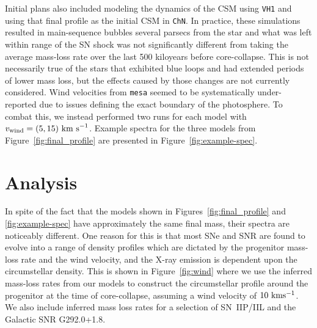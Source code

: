 \documentclass[twocolumn]{aastex631}
\begin{document}
Initial plans also included modeling the dynamics of the CSM using \texttt{VH1} and using that final profile as the initial CSM in \texttt{ChN}. In practice, these simulations resulted in main-sequence bubbles several parsecs from the star and what was left within range of the SN shock was not significantly different from taking the average mass-loss rate over the last 500 kiloyears before core-collapse. This is not necessarily true of the stars that exhibited blue loops and had extended periods of lower mass loss, but the effects caused by those changes are not currently considered. Wind velocities from \texttt{mesa} seemed to be systematically under-reported due to issues defining the exact boundary of the photosphere. To combat this, we instead performed two runs for each model with $v_{\rm wind} = (5,15)\  \text{km\ s}^{-1}$. Example spectra for the three models from Figure~\ref{fig:final_profile} are presented in Figure~\ref{fig:example-spec}.

\section{Analysis}
\label{spectra}
In spite of the fact that the models shown in Figures~\ref{fig:final_profile} and  \ref{fig:example-spec} have approximately the same final mass, their spectra are noticeably different. One reason for this is that %
most SNe and SNR are found to evolve into a range of density profiles which are dictated by the progenitor mass-loss rate and the wind velocity, and the X-ray emission is dependent upon the circumstellar density. This is shown in Figure~\ref{fig:wind} where we use the inferred mass-loss rates from our models to construct the circumstellar profile around the progenitor at the time of core-collapse, assuming a wind velocity of $10~\rm km s^{-1}$. We also include inferred mass loss rates for a selection of SN~IIP/IIL and the Galactic SNR G292.0+1.8. 
\end{document}
